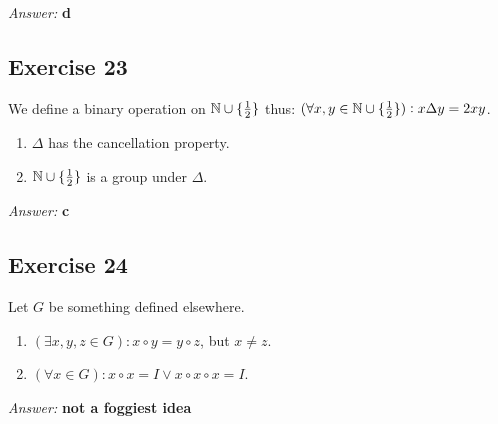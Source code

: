 \documentclass[11pt]{article}
\begin{document}
\emph{Answer:} \textbf{d}
\subsection{Exercise 23}
\label{sec-2-23}
We define a binary operation on $\mathbb{N} \cup \{{1\over 2}\}$ thus:
$(\forall x, y \in \mathbb{N} \cup \{{1\over 2}\}): x \Delta y = 2xy$.
\begin{enumerate}
\item $\Delta$ has the cancellation property.
\item $\mathbb{N} \cup \{{1\over 2}\}$ is a group under $\Delta$.
\end{enumerate}

\emph{Answer:} \textbf{c}
\subsection{Exercise 24}
\label{sec-2-24}
Let $G$ be something defined elsewhere.
\begin{enumerate}
\item $(\exists x, y, z \in G): x \circ y = y \circ z$, but $x \neq z$.
\item $(\forall x \in G): x \circ x = I \lor x \circ x \circ x = I$.
\end{enumerate}

\emph{Answer:} \textbf{not a foggiest idea}
\end{document}
